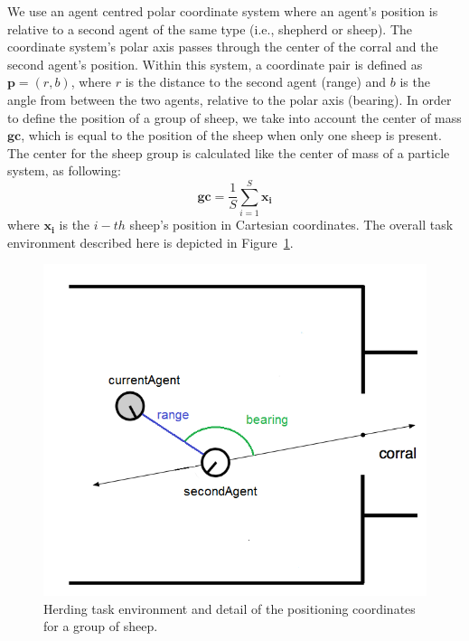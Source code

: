 \documentclass[conference]{IEEEtran}
\begin{document}
We use an agent centred polar coordinate system where an agent's position is relative to a second agent of the same type (i.e., shepherd or sheep).
The coordinate system's polar axis passes through the center of the corral and the second agent's position. 
Within this system, a coordinate pair is defined as $\mathbf{p} = (r, b)$, where $r$ is the distance to the second agent (range) and $b$ is the angle from between the two agents, relative to the polar axis (bearing).
In order to define the position of a group of sheep, we take into account the center of mass $\mathbf{gc}$, which is equal to the position of the sheep when only one sheep is present.
The center for the sheep group is calculated like the center of mass of a particle system, as following:
\begin{equation} \label{eq:gc}
\mathbf{gc} = \frac{1}{S} \sum_{i=1}^{S}{\mathbf{x_i}}
\end{equation}
where $\mathbf{x_i}$ is the $i-th$ sheep's position in Cartesian coordinates.
The overall task environment described here is depicted in Figure~\ref{fig:task_env}. 

\begin{figure}[ht]
	\centering
	\includegraphics[width=0.8\hsize]{imgs/herding_environment.png}
	\caption{Herding task environment and detail of the positioning coordinates for a group of sheep.}
	\label{fig:task_env}
\end{figure}
\end{document}

